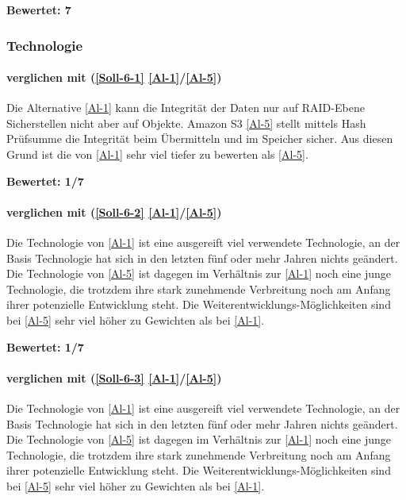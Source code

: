 \textbf{Bewertet: 7}


\subsubsection{Technologie}

\paragraph*{  verglichen mit  (\ref{Soll-6-1} \ref{Al-1}/\ref{Al-5})} 
Die Alternative \ref{Al-1} kann die Integrität der Daten nur auf RAID-Ebene Sicherstellen nicht aber auf Objekte. Amazon S3 \ref{Al-5} stellt mittels Hash Prüfsumme die Integrität beim Übermitteln und im Speicher sicher. Aus diesen Grund ist die  von \ref{Al-1} sehr viel tiefer zu bewerten als \ref{Al-5}.

\textbf{Bewertet: 1/7}

\paragraph*{  verglichen mit  (\ref{Soll-6-2} \ref{Al-1}/\ref{Al-5})} 
Die Technologie von \ref{Al-1} ist eine ausgereift viel verwendete Technologie, an der Basis Technologie hat sich in den letzten fünf oder mehr Jahren nichts geändert. Die Technologie von \ref{Al-5} ist dagegen im Verhältnis zur \ref{Al-1} noch eine junge Technologie, die trotzdem ihre stark zunehmende Verbreitung noch am Anfang ihrer potenzielle Entwicklung steht. Die Weiterentwicklungs-Möglichkeiten sind bei \ref{Al-5} sehr viel höher zu Gewichten als bei \ref{Al-1}.

\textbf{Bewertet: 1/7}

\paragraph*{  verglichen mit  (\ref{Soll-6-3} \ref{Al-1}/\ref{Al-5})} 
Die Technologie von \ref{Al-1} ist eine ausgereift viel verwendete Technologie, an der Basis Technologie hat sich in den letzten fünf oder mehr Jahren nichts geändert. Die Technologie von \ref{Al-5} ist dagegen im Verhältnis zur \ref{Al-1} noch eine junge Technologie, die trotzdem ihre stark zunehmende Verbreitung noch am Anfang ihrer potenzielle Entwicklung steht. Die Weiterentwicklungs-Möglichkeiten sind bei \ref{Al-5} sehr viel höher zu Gewichten als bei \ref{Al-1}.

